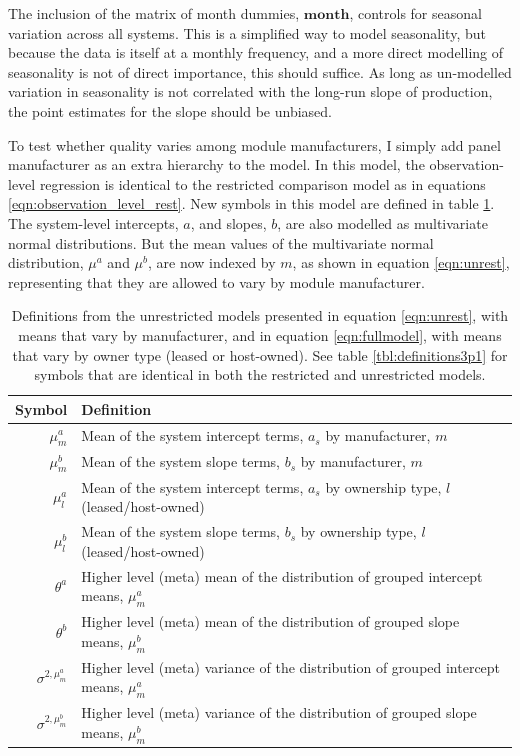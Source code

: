 \documentclass[a4paper]{article}
\begin{document}
The inclusion of the matrix of month dummies, $\mathbf{month}$, controls for seasonal variation across all systems. This is a simplified way to model seasonality, but because the data is itself at a monthly frequency, and a more direct modelling of seasonality is not of direct importance, this should suffice. As long as un-modelled variation in seasonality is not correlated with the long-run slope of production, the point estimates for the slope should be unbiased.

To test whether quality varies among module manufacturers, I simply add panel manufacturer as an extra hierarchy to the model. In this model, the observation-level regression is identical to the restricted comparison model as in equations \ref{eqn:observation_level_rest}. New symbols in this model are defined in table \ref{tbl:definitions3p2}. The system-level intercepts, $a$, and slopes, $b$, are also modelled as multivariate normal distributions. But the mean values of the multivariate normal distribution, $\mu^a$ and $\mu^b$, are now indexed by $m$, as shown in equation \ref{eqn:unrest}, representing that they are allowed to vary by module manufacturer.

\begin{table}
  \begin{tabular}{rl}
  \toprule
    Symbol &  Definition \\
    \midrule
    $\mu^a_m$ & Mean of the system intercept terms, $a_s$ by manufacturer, $m$ \\
    $\mu^b_m$ & Mean of the system slope terms, $b_s$ by manufacturer, $m$ \\
    $\mu^a_l$ & Mean of the system intercept terms, $a_s$ by ownership type, $l$ (leased/host-owned) \\
    $\mu^b_l$ & Mean of the system slope terms, $b_s$ by ownership type, $l$ (leased/host-owned) \\
    $\theta^a$ & Higher level (meta) mean of the distribution of grouped intercept means, $\mu^a_m$ \\
    $\theta^b$ & Higher level (meta) mean of the distribution of grouped slope means, $\mu^b_m$ \\
    $\sigma^{2, \mu^a_m}$ & Higher level (meta) variance of the distribution of grouped intercept means, $\mu^a_m$ \\
    $\sigma^{2, \mu^b_m}$ & Higher level (meta) variance of the distribution of grouped slope means, $\mu^b_m$ \\


  \bottomrule
  \end{tabular}

  \caption{Definitions from the unrestricted models presented in equation \ref{eqn:unrest}, with means that vary by manufacturer, and in equation \ref{eqn:fullmodel}, with means that vary by owner type (leased or host-owned). See table \ref{tbl:definitions3p1} for symbols that are identical in both the restricted and unrestricted models. \label{tbl:definitions3p2}}
\end{table}
\end{document}

